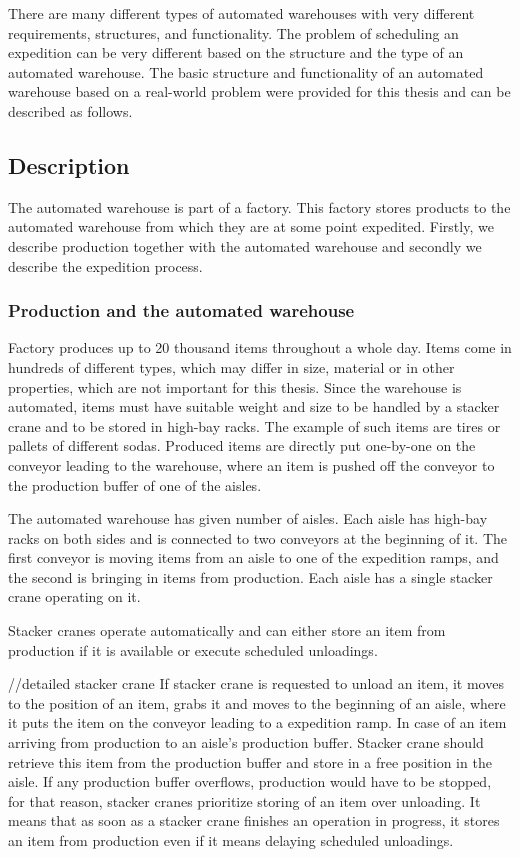 \documentclass{ctuthesis}
\begin{document}
There are many different types of automated warehouses with very different requirements, structures, and functionality. The problem of scheduling an expedition can be very different based on the structure and the type of an automated warehouse. The basic structure and functionality of an automated warehouse based on a real-world problem were provided for this thesis and can be described as follows.

\subsection{Description}
\label{subsec:Description}
The automated warehouse is part of a factory. This factory stores products to the automated warehouse from which they are at some point expedited. Firstly, we describe production together with the automated warehouse and secondly we describe the expedition process.

\subsubsection{Production and the automated warehouse}

Factory produces up to 20 thousand items throughout a whole day. Items come in hundreds of different types, which may differ in size, material or in other properties, which are not important for this thesis. Since the warehouse is automated, items must have suitable weight and size to be handled by a stacker crane and to be stored in high-bay racks. The example of such items are tires or pallets of different sodas. Produced items are directly put one-by-one on the conveyor leading to the warehouse, where an item is pushed off the conveyor to the production buffer of one of the aisles.

The automated warehouse has given number of aisles. Each aisle has high-bay racks on both sides and is connected to two conveyors at the beginning of it. The first conveyor is moving items from an aisle to one of the expedition ramps, and the second is bringing in items from production. Each aisle has a single stacker crane operating on it.

Stacker cranes operate automatically and can either store an item from production if it is available or execute scheduled unloadings. 

//detailed stacker crane
If stacker crane is requested to unload an item, it moves to the position of an item, grabs it and moves to the beginning of an aisle, where it puts the item on the conveyor leading to a expedition ramp. In case of an item arriving from production to an aisle's production buffer. Stacker crane should retrieve this item from the production buffer and store in a free position in the aisle. If any production buffer overflows, production would have to be stopped, for that reason, stacker cranes prioritize storing of an item over unloading. It means that as soon as a stacker crane finishes an operation in progress, it stores an item from production even if it means delaying scheduled unloadings.
\end{document}
